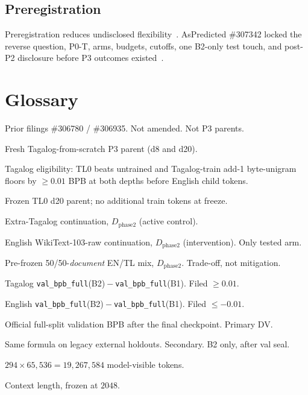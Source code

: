 \documentclass[11pt,a4paper]{article}
\begin{document}
\subsection{Preregistration}
Preregistration reduces undisclosed flexibility~\cite{nosek2018prereg,wagenmakers2012confirmatory}. AsPredicted \#307342 locked the reverse question, P0-T, arms, budgets, cutoffs, one B2-only test touch, and post-P2 disclosure before P3 outcomes existed~\cite{aspredicted307342}.

\section{Glossary}
\label{sec:glossary}

\begin{description}[style=nextline,leftmargin=1.25em]
\item[P1.1 / P2] Prior filings \#306780 / \#306935. Not amended. Not P3 parents.
\item[TL0] Fresh Tagalog-from-scratch P3 parent (d8 and d20).
\item[P0-T] Tagalog eligibility: TL0 beats untrained and Tagalog-train add-1 byte-unigram floors by $\ge 0.01$ BPB at both depths before English child tokens.
\item[B0] Frozen TL0 d20 parent; no additional train tokens at freeze.
\item[B1] Extra-Tagalog continuation, $D_{\mathrm{phase2}}$ (active control).
\item[B2] English WikiText-103-raw continuation, $D_{\mathrm{phase2}}$ (intervention). Only tested arm.
\item[B3] Pre-frozen 50/50-\emph{document} EN/TL mix, $D_{\mathrm{phase2}}$. Trade-off, not mitigation.
\item[$C_{\mathrm{tl}}$] Tagalog \texttt{val\_bpb\_full}(B2)${}-{}$\texttt{val\_bpb\_full}(B1). Filed $\ge 0.01$.
\item[$G_{\mathrm{en}}$] English \texttt{val\_bpb\_full}(B2)${}-{}$\texttt{val\_bpb\_full}(B1). Filed $\le -0.01$.
\item[val\_bpb\_full] Official full-split validation BPB after the final checkpoint. Primary DV.
\item[test\_bpb] Same formula on legacy external holdouts. Secondary. B2 only, after val seal.
\item[$D_{\mathrm{phase2}}$] $294\times 65{,}536=19{,}267{,}584$ model-visible tokens.
\item[$T$] Context length, frozen at $2048$.
\end{description}
\end{document}
